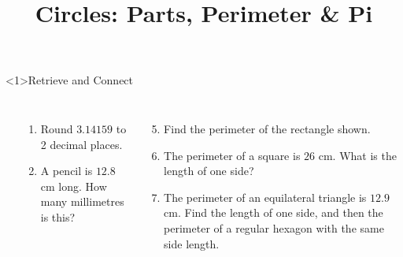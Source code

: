 \documentclass{beamer}
\title{Circles: Parts, Perimeter \& Pi}
\author{}
\date{}
\newcommand{\ablank}[1]{%
  \alt<2>{\textcolor{red}{#1}}{\underline{\phantom{#1}}}%
}
\newcommand{\ashow}[1]{\uncover<2->{\textcolor{red}{\small #1}}}
\newcommand{\ashowq}[1]{\alt<2->{\textcolor{red}{\small #1}}{?}}
\begin{document}

\begin{frame}<1>{Retrieve and Connect}


\begin{columns}

\begin{center}
\end{center}

\small
\begin{enumerate}
  \item Round $3.14159$ to 2 decimal places. \ashow{3.14}
  \item A pencil is $12.8$ cm long. How many millimetres is this? \ablank{128 mm}
\end{enumerate}

\begin{enumerate}
  \setcounter{enumi}{4}
  \item Find the perimeter of the rectangle shown. \ashow{25.4 cm}
  \item The perimeter of a square is $26$ cm. What is the length of one side? \ashow{6.5 cm}
  \item  The perimeter of an equilateral triangle is $12.9$ cm. 
    Find the length of one side, and then the perimeter of a regular hexagon with the same side length. \ashow{$4.3$ cm; hexagon: $25.8$ cm}
\end{enumerate}

\end{columns}
\end{frame}
\end{document}

